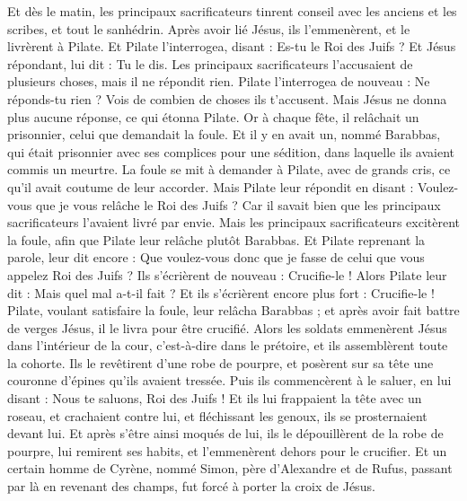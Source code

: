 \begin{multicols}{2}
\VerseOne{}Et dès le matin, les principaux sacrificateurs tinrent conseil avec les anciens et les scribes, et tout le sanhédrin. Après avoir lié Jésus, ils l'emmenèrent, et le livrèrent à Pilate.
Et Pilate l'interrogea, disant : Es-tu le Roi des Juifs ? Et Jésus répondant, lui dit : Tu le dis.
Les principaux sacrificateurs l'accusaient de plusieurs choses, mais il ne répondit rien.
Pilate l'interrogea de nouveau : Ne réponds-tu rien ? Vois de combien de choses ils t'accusent.
Mais Jésus ne donna plus aucune réponse, ce qui étonna Pilate.
Or à chaque fête, il relâchait un prisonnier, celui que demandait la foule.
Et il y en avait un, nommé Barabbas, qui était prisonnier avec ses complices pour une sédition, dans laquelle ils avaient commis un meurtre.
La foule se mit à demander à Pilate, avec de grands cris, ce qu'il avait coutume de leur accorder.
Mais Pilate leur répondit en disant : Voulez-vous que je vous relâche le Roi des Juifs ?
Car il savait bien que les principaux sacrificateurs l'avaient livré par envie.
Mais les principaux sacrificateurs excitèrent la foule, afin que Pilate leur relâche plutôt Barabbas.
Et Pilate reprenant la parole, leur dit encore : Que voulez-vous donc que je fasse de celui que vous appelez Roi des Juifs ?
Ils s'écrièrent de nouveau : Crucifie-le !
Alors Pilate leur dit : Mais quel mal a-t-il fait ? Et ils s'écrièrent encore plus fort : Crucifie-le !
Pilate, voulant satisfaire la foule, leur relâcha Barabbas ; et après avoir fait battre de verges Jésus, il le livra pour être crucifié.
Alors les soldats emmenèrent Jésus dans l'intérieur de la cour, c'est-à-dire dans le prétoire, et ils assemblèrent toute la cohorte.
Ils le revêtirent d'une robe de pourpre, et posèrent sur sa tête une couronne d'épines qu'ils avaient tressée.
Puis ils commencèrent à le saluer, en lui disant : Nous te saluons, Roi des Juifs !
Et ils lui frappaient la tête avec un roseau, et crachaient contre lui, et fléchissant les genoux, ils se prosternaient devant lui.
Et après s'être ainsi moqués de lui, ils le dépouillèrent de la robe de pourpre, lui remirent ses habits, et l'emmenèrent dehors pour le crucifier.
Et un certain homme de Cyrène, nommé Simon, père d'Alexandre et de Rufus, passant par là en revenant des champs, fut forcé à porter la croix de Jésus.

\end{multicols}
